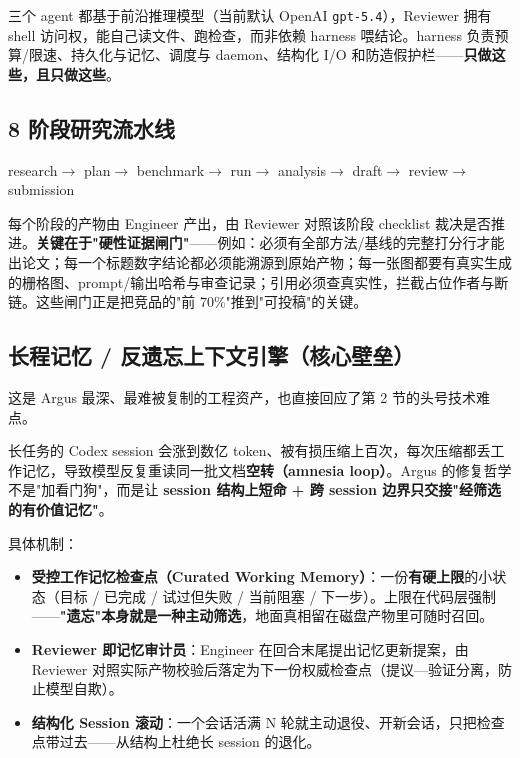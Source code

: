 \documentclass[UTF8,11pt,fontset=none]{ctexart}
\newcommand{\hl}[1]{\textbf{\color{argusnavy}#1}}
\begin{document}
三个 agent 都基于前沿推理模型（当前默认 OpenAI \texttt{gpt-5.4}），Reviewer 拥有 shell 访问权，能自己读文件、跑检查，而非依赖 harness 喂结论。harness 负责预算/限速、持久化与记忆、调度与 daemon、结构化 I/O 和防造假护栏——\textbf{只做这些，且只做这些}。

\subsection{8 阶段研究流水线}

\begin{center}
\colorbox{argusteal}{\color{white}\sffamily\;research\;}$\rightarrow$
\colorbox{argusteal}{\color{white}\sffamily\;plan\;}$\rightarrow$
\colorbox{argusteal}{\color{white}\sffamily\;benchmark\;}$\rightarrow$
\colorbox{argusteal}{\color{white}\sffamily\;run\;}$\rightarrow$
\colorbox{argusteal}{\color{white}\sffamily\;analysis\;}$\rightarrow$
\colorbox{argusteal}{\color{white}\sffamily\;draft\;}$\rightarrow$
\colorbox{argusteal}{\color{white}\sffamily\;review\;}$\rightarrow$
\colorbox{argusnavy}{\color{white}\sffamily\;submission\;}
\end{center}

每个阶段的产物由 Engineer 产出，由 Reviewer 对照该阶段 checklist 裁决是否推进。\textbf{关键在于"硬性证据闸门"}——例如：必须有全部方法/基线的完整打分行才能出论文；每一个标题数字结论都必须能溯源到原始产物；每一张图都要有真实生成的栅格图、prompt/输出哈希与审查记录；引用必须查真实性，拦截占位作者与断链。这些闸门正是把竞品的"前 70\%"推到"可投稿"的关键。

\subsection{长程记忆 / 反遗忘上下文引擎（核心壁垒）}

这是 Argus 最深、最难被复制的工程资产，也直接回应了第 2 节的头号技术难点。

\begin{keybox}
长任务的 Codex session 会涨到数亿 token、被有损压缩上百次，每次压缩都丢工作记忆，导致模型反复重读同一批文档\textbf{空转（amnesia loop）}。Argus 的修复哲学不是"加看门狗"，而是让 \textbf{session 结构上短命 + 跨 session 边界只交接"经筛选的有价值记忆"}。
\end{keybox}

具体机制：
\begin{itemize}
  \item \hl{受控工作记忆检查点（Curated Working Memory）}：一份\textbf{有硬上限}的小状态（目标 / 已完成 / 试过但失败 / 当前阻塞 / 下一步）。上限在代码层强制——\textbf{"遗忘"本身就是一种主动筛选}，地面真相留在磁盘产物里可随时召回。
  \item \hl{Reviewer 即记忆审计员}：Engineer 在回合末尾提出记忆更新提案，由 Reviewer 对照实际产物校验后落定为下一份权威检查点（提议—验证分离，防止模型自欺）。
  \item \hl{结构化 Session 滚动}：一个会话活满 N 轮就主动退役、开新会话，只把检查点带过去——从结构上杜绝长 session 的退化。
\end{itemize}
\end{document}
